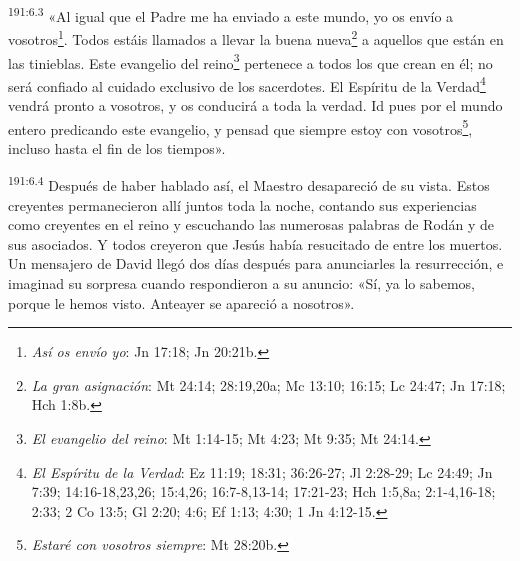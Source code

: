 \par
\textsuperscript{191:6.3} «Al igual que el Padre me ha enviado a este mundo, yo os envío a vosotros\footnote{\textit{Así os envío yo}: Jn 17:18; Jn 20:21b.}. Todos estáis llamados a llevar la buena nueva\footnote{\textit{La gran asignación}: Mt 24:14; 28:19,20a; Mc 13:10; 16:15; Lc 24:47; Jn 17:18; Hch 1:8b.} a aquellos que están en las tinieblas. Este evangelio del reino\footnote{\textit{El evangelio del reino}: Mt 1:14-15; Mt 4:23; Mt 9:35; Mt 24:14.} pertenece a todos los que crean en él; no será confiado al cuidado exclusivo de los sacerdotes. El Espíritu de la Verdad\footnote{\textit{El Espíritu de la Verdad}: Ez 11:19; 18:31; 36:26-27; Jl 2:28-29; Lc 24:49; Jn 7:39; 14:16-18,23,26; 15:4,26; 16:7-8,13-14; 17:21-23; Hch 1:5,8a; 2:1-4,16-18; 2:33; 2 Co 13:5; Gl 2:20; 4:6; Ef 1:13; 4:30; 1 Jn 4:12-15.} vendrá pronto a vosotros, y os conducirá a toda la verdad. Id pues por el mundo entero predicando este evangelio, y pensad que siempre estoy con vosotros\footnote{\textit{Estaré con vosotros siempre}: Mt 28:20b.}, incluso hasta el fin de los tiempos».

\par
\textsuperscript{191:6.4} Después de haber hablado así, el Maestro desapareció de su vista. Estos creyentes permanecieron allí juntos toda la noche, contando sus experiencias como creyentes en el reino y escuchando las numerosas palabras de Rodán y de sus asociados. Y todos creyeron que Jesús había resucitado de entre los muertos. Un mensajero de David llegó dos días después para anunciarles la resurrección, e imaginad su sorpresa cuando respondieron a su anuncio: «Sí, ya lo sabemos, porque le hemos visto. Anteayer se apareció a nosotros».